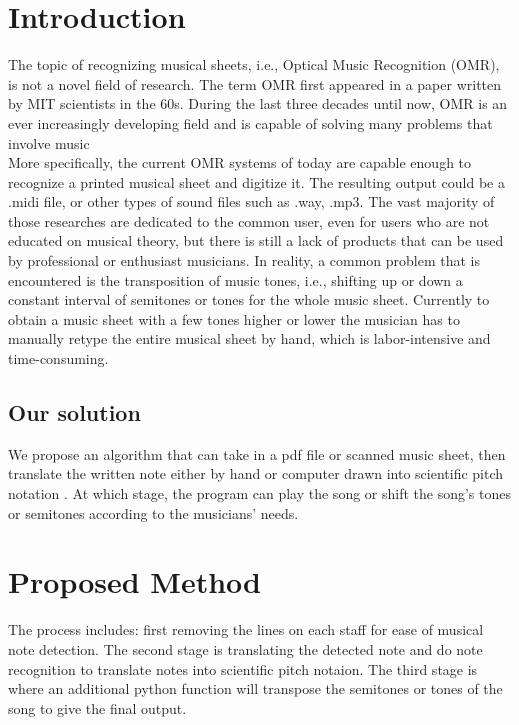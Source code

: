 \documentclass[a4paper,12pt]{report}
\begin{document}



\section{Introduction}

The topic of recognizing musical sheets, i.e., Optical Music Recognition (OMR),
is not a novel field of research. The term OMR first appeared in a paper written
by MIT scientists in the 60s.  During the last three decades until now, OMR is
an ever increasingly developing field and is capable of solving many problems
that involve music \cite{Shatri2020a}\\

More specifically, the current OMR systems of today are capable enough to
recognize a printed musical sheet and digitize it. The resulting output could be
a .midi file, or other types of sound files such as .way, .mp3. The vast
majority of those researches are dedicated to the common user, even for users
who are not educated on musical theory, but there is still a lack of products
that can be used by professional or enthusiast musicians. In reality, a common
problem that is encountered is the transposition of music tones, i.e., shifting up or down a constant interval of
semitones or tones for the whole music sheet. Currently to obtain a music
sheet with a few tones higher or lower the musician has to manually retype the
entire musical sheet by hand, which is labor-intensive and time-consuming.

\clearpage

\subsection{Our solution}

We propose an algorithm that can take in a pdf file or scanned music sheet, then
translate the written note either by hand or computer drawn into scientific
pitch notation \cite{Wikipedia2013}.  At which stage, the program can play the
song or shift the song's tones or semitones according to the musicians' needs.


\section{Proposed Method}
The process includes: first removing the lines on each staff for ease of musical
note detection. The second stage is translating the detected note and do note
recognition to translate notes into scientific pitch notaion. The third stage is
where an additional python function will transpose the semitones or tones of the song to give
the final output. 
\end{document}
